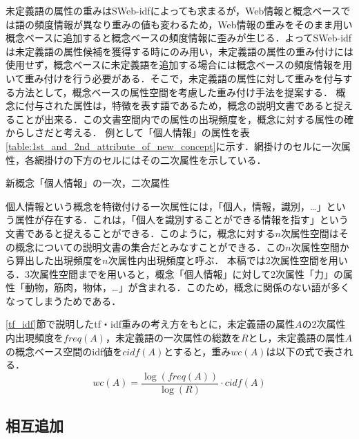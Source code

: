 \documentclass[japanese]{jnlp_1.4}
\begin{document}
未定義語の属性の重みはSWeb-idfによっても求まるが，Web情報と概念ベースでは語の頻度情報が異なり重みの値も変わるため，Web情報の重みをそのまま用い概念ベースに追加すると概念ベースの頻度情報に歪みが生じる．よってSWeb-idfは未定義語の属性候補を獲得する時にのみ用い，未定義語の属性の重み付けには使用せず，概念ベースに未定義語を追加する場合には概念ベースの頻度情報を用いて重み付けを行う必要がある．そこで，未定義語の属性に対して重みを付与する方法として，概念ベースの属性空間を考慮した重み付け手法を提案する．
概念に付与された属性は，特徴を表す語であるため，概念の説明文書であると捉えることが出来る．この文書空間内での属性の出現頻度を，概念に対する属性の確からしさだと考える．
例として「個人情報」の属性を表\ref{table:1st_and_2nd_attribute_of_new_concept}に示す．網掛けのセルに一次属性，各網掛けの下方のセルにはその二次属性を示している．

\begin{table}[b]
\caption{新概念「個人情報」の一次，二次属性}
\label{table:1st_and_2nd_attribute_of_new_concept}

\end{table}

個人情報という概念を特徴付ける一次属性には，「個人，情報，識別，…」という属性が存在する．これは，「個人を識別することができる情報を指す」という文書であると捉えることができる．このように，概念に対する$n$次属性空間はその概念についての説明文書の集合だとみなすことができる．この$n$次属性空間から算出した出現頻度を$n$次属性内出現頻度と呼ぶ． 
本稿では2次属性空間を用いる．3次属性空間までを用いると，概念「個人情報」に対して2次属性「力」の属性「動物，筋肉，物体，…」が含まれる．このため，概念に関係のない語が多くなってしまうためである．

\ref{tf_idf}節で説明したtf・idf重みの考え方をもとに，未定義語の属性$A$の2次属性内出現頻度を$freq(A)$，未定義語の一次属性の総数を$R$とし，未定義語の属性$A$の概念ベース空間のidf値を$cidf(A)$とすると，重み$wc(A)$は以下の式で表される．
\begin{equation}
 wc(A)=\frac{\log(freq(A))}{\log(R)}{\cdot}cidf(A)
\end{equation}


\subsection{相互追加}
\label{addict}
\end{document}
